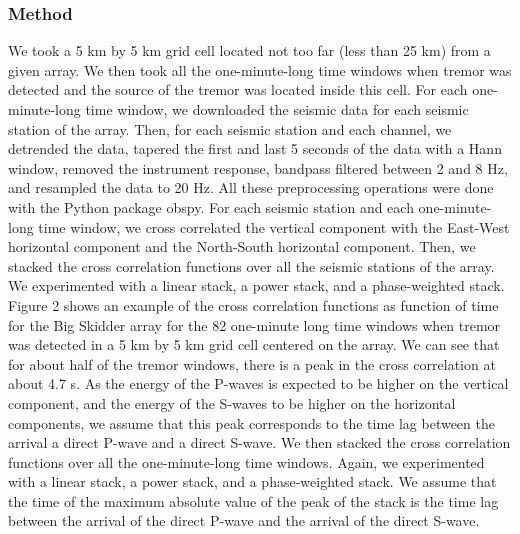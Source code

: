 \documentclass[letterpaper, 12pt]{article}
\begin{document}
\subsubsection{Method}

We took a 5 km by 5 km grid cell located not too far (less than 25 km) from a given array. We then took all the one-minute-long time windows when tremor was detected and the source of the tremor was located inside this cell. For each one-minute-long time window, we downloaded the seismic data for each seismic station of the array. Then, for each seismic station and each channel, we detrended the data, tapered the first and last 5 seconds of the data with a Hann window, removed the instrument response, bandpass filtered between 2 and 8 Hz, and resampled the data to 20 Hz. All these preprocessing operations were done with the Python package obspy. For each seismic station and each one-minute-long time window, we cross correlated the vertical component with the East-West horizontal component and the North-South horizontal component. Then, we stacked the cross correlation functions over all the seismic stations of the array. We experimented with a linear stack, a power stack, and a phase-weighted stack. Figure 2 shows an example of the cross correlation functions as function of time for the Big Skidder array for the 82 one-minute long time windows when tremor was detected in a 5 km by 5 km grid cell centered on the array. We can see that for about half of the tremor windows, there is a peak in the cross correlation at about 4.7 s. As the energy of the P-waves is expected to be higher on the vertical component, and the energy of the S-waves to be higher on the horizontal components, we assume that this peak corresponds to the time lag between the arrival a direct P-wave and a direct S-wave. We then stacked the cross correlation functions over all the one-minute-long time windows. Again, we experimented with a linear stack, a power stack, and a phase-weighted stack. We assume that the time of the maximum absolute value of the peak of the stack is the time lag between the arrival of the direct P-wave and the arrival of the direct S-wave. \\
\end{document}

